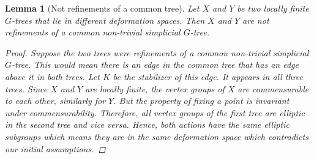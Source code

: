 \documentclass[12pt,parskip=full]{report}
\theoremstyle{plain}
\newtheorem{lem}[thm]{Lemma}
\theoremstyle{definition}
\begin{document}
\begin{lem}
    [Not refinements of a common tree]
    \label{lem:nocommonrefinement} 
    Let \(X\) and \(Y\) be two locally finite \(G\)-trees that lie in different deformation spaces. Then $X$ and $Y$ are not refinements of a common non-trivial simplicial $G$-tree.
    \begin{proof}
        Suppose the two trees were refinements of a common non-trivial simplicial $G$-tree. This would mean there is an edge in the common tree that has an edge above it in both trees. Let \(K\) be the stabilizer of this edge. It appears in all three trees. Since $X$ and $Y$ are locally finite, the vertex groups of $X$ are commensurable to each other, similarly for $Y$. But the property of fixing a point is invariant under commensurability. Therefore, all vertex groups of the first tree are elliptic in the second tree and vice versa. Hence, both actions have the same elliptic subgroups which means they are in the same deformation space which contradicts our initial assumptions.
    \end{proof}
\end{lem}



\end{document}
